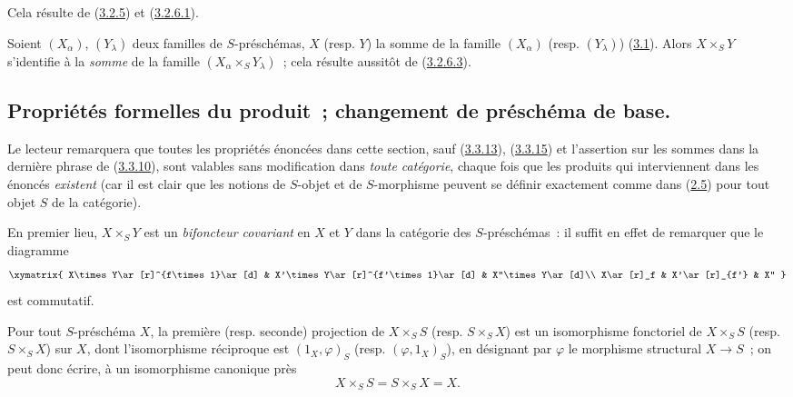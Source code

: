 Cela résulte de (\hyperref[I.3.2.5-fr]{3.2.5}) et
(\hyperref[I.3.2.6.1-fr]{3.2.6.1}).

\begin{env}[3.2.8]
\label{I.3.2.8-fr}
Soient $(X_\alpha)$, $(Y_\lambda)$ deux familles de $S$-préschémas, $X$
(resp. $Y$) la somme de la famille $(X_\alpha)$ (resp. $(Y_\lambda)$)
(\hyperref[subsection:I.3.1-fr]{3.1}). Alors $X\times_S Y$ s'identifie à la
\emph{somme} de la famille $(X_\alpha\times_S Y_\lambda)$~; cela résulte
aussitôt de (\hyperref[I.3.2.6.3-fr]{3.2.6.3}).
\end{env}

\subsection{Propriétés formelles du produit~; changement de préschéma de base.}
\label{subsection:I.3.3-fr}

\begin{env}[3.3.1]
\label{I.3.3.1-fr}
Le lecteur remarquera que toutes les propriétés énoncées dans cette section,
sauf (\hyperref[I.3.3.13-fr]{3.3.13}), (\hyperref[I.3.3.15-fr]{3.3.15}) et l'assertion sur les sommes dans la dernière phrase de
(\hyperref[I.3.3.10-fr]{3.3.10}), sont valables sans modification dans
\emph{toute catégorie}, chaque fois que les produits qui interviennent dans
les énoncés \emph{existent} (car il est clair que les notions de $S$-objet et
de $S$-morphisme peuvent se définir exactement comme dans
(\hyperref[subsection:I.2.5-fr]{2.5}) pour tout objet $S$ de la catégorie).
\end{env}

\begin{env}[3.3.2]
\label{I.3.3.2-fr}
En premier lieu, $X\times_S Y$ est un \emph{bifoncteur covariant} en $X$ et
$Y$ dans la catégorie des $S$-préschémas~: il suffit en effet de remarquer
que le diagramme
\[
  \xymatrix{
    X\times Y\ar[r]^{f\times 1}\ar[d] &
    X'\times Y\ar[r]^{f'\times 1}\ar[d] &
    X''\times Y\ar[d]\\
    X\ar[r]_f & X'\ar[r]_{f'} & X''
  }
\]
est commutatif.
\end{env}

\begin{proposition}[3.3.3]
\label{I.3.3.3-fr}
Pour tout $S$-préschéma $X$, la première (resp. seconde) projection de
$X\times_S S$ (resp. $S\times_S X$) est un isomorphisme fonctoriel de
$X\times_S S$ (resp. $S\times_S X$) sur $X$, dont l'isomorphisme réciproque
est $(1_X,\varphi)_S$ (resp. $(\varphi,1_X)_S$), en désignant par $\varphi$
le morphisme structural $X\to S$~; on peut donc écrire, à un isomorphisme
canonique près
\[
  X\times_S S=S\times_S X=X.
\]
\end{proposition}

